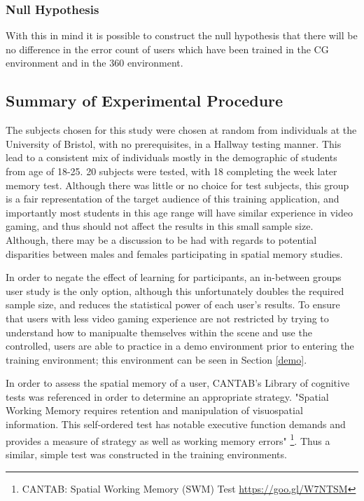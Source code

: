 \documentclass[ %
                    author={Elis Jones},
                supervisor={Dr. Kirsten Cater},
                    degree={BSc},
                     title={The Effect of Presentation Medium on Spatial Cognition},
                  subtitle={in the Virtual Environment},
                      year={2018} ]{dissertation}
\begin{document}
\subsubsection{Null Hypothesis}
With this in mind it is possible to construct the null hypothesis that there will be no difference in the error count of users which have been trained in the CG environment and in the 360 environment.


\subsection{Summary of Experimental Procedure}\label{cantab}
The subjects chosen for this study were chosen at random from individuals at the University of Bristol, with no prerequisites, in a Hallway testing manner. This lead to a consistent mix of individuals mostly in the demographic of students from age of 18-25. 20 subjects were tested, with 18 completing the week later memory test. Although there was little or no choice for test subjects, this group is a fair representation of the target audience of this training application, and importantly most students in this age range will have similar experience in video gaming, and thus should not affect the results in this small sample size. Although, there may be a discussion to be had with regards to potential disparities between males and females participating in spatial memory studies. 

In order to negate the effect of learning for participants, an in-between groups user study is the only option, although this unfortunately doubles the required sample size, and reduces the statistical power of  each user's results. To ensure that users with less video gaming experience are not restricted by trying to understand how to manipualte themselves within the scene and use the controlled, users are able to practice in a demo environment prior to entering the training environment; this environment can be seen in Section \ref{demo}.

In order to assess the spatial memory of a user, CANTAB's Library of cognitive tests was referenced in order to determine an appropriate strategy. "Spatial Working Memory requires retention and manipulation of visuospatial information. This self-ordered test has notable executive function demands and provides a measure of strategy as well as working memory errors" \footnote{ CANTAB: Spatial Working Memory (SWM) Test \url{https://goo.gl/W7NTSM}}. Thus a similar, simple test was constructed in the training environments. 
\end{document}
